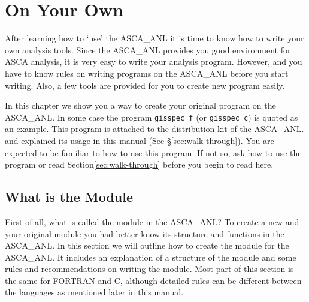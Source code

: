 \chapter{On Your Own}
After learning how to `use' the ASCA\_ANL
it is time to know how to write your own analysis tools.
Since the ASCA\_ANL provides you good environment for ASCA analysis,
it is very easy to write your analysis program.
However,
and you have to know rules on writing programs on the ASCA\_ANL
before you start writing.
Also,
a few tools are provided for you to create new program easily.

In this chapter
we show you a way to create your original program on the ASCA\_ANL.
In some case
the program {\tt gisspec\_f} (or {\tt gisspec\_c}) is quoted as an example.
This program is attached to the distribution kit of the ASCA\_ANL.
and explained its usage in this manual (See \S \ref{sec:walk-through}).
You are expected to be familiar to how to use this program.
If not so,
ask how to use the program or read Section\ref{sec:walk-through}
before you begin to read here.

\section{What is the Module}
\label{sec:module}
First of all,
what is called the module in the ASCA\_ANL?
To create a new and your original module
you had better know its structure and functions in the ASCA\_ANL.
In this section
we will outline how to create the module for the ASCA\_ANL.
It includes
an explanation of a structure of the module
and some rules and recommendations on writing the module.
Most part of this section is the same for FORTRAN and C,
although detailed rules can be different between the languages
as mentioned later in this manual.

